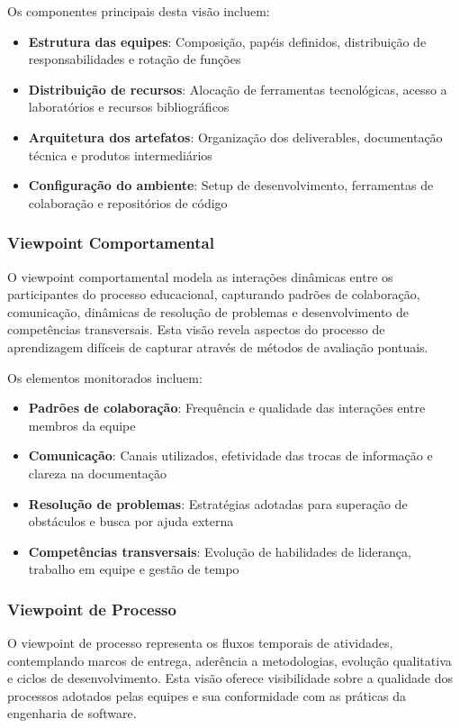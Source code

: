 \documentclass[english, spanish, brazilian]{modelo_dt}
\begin{document}
Os componentes principais desta visão incluem:
\begin{itemize}
\item \textbf{Estrutura das equipes}: Composição, papéis definidos, distribuição de responsabilidades e rotação de funções
\item \textbf{Distribuição de recursos}: Alocação de ferramentas tecnológicas, acesso a laboratórios e recursos bibliográficos
\item \textbf{Arquitetura dos artefatos}: Organização dos deliverables, documentação técnica e produtos intermediários
\item \textbf{Configuração do ambiente}: Setup de desenvolvimento, ferramentas de colaboração e repositórios de código
\end{itemize}

\subsubsection{Viewpoint Comportamental}

O viewpoint comportamental modela as interações dinâmicas entre os participantes do processo educacional, capturando padrões de colaboração, comunicação, dinâmicas de resolução de problemas e desenvolvimento de competências transversais\@. Esta visão revela aspectos do processo de aprendizagem difíceis de capturar através de métodos de avaliação pontuais\@.

Os elementos monitorados incluem:
\begin{itemize}
\item \textbf{Padrões de colaboração}: Frequência e qualidade das interações entre membros da equipe
\item \textbf{Comunicação}: Canais utilizados, efetividade das trocas de informação e clareza na documentação
\item \textbf{Resolução de problemas}: Estratégias adotadas para superação de obstáculos e busca por ajuda externa
\item \textbf{Competências transversais}: Evolução de habilidades de liderança, trabalho em equipe e gestão de tempo
\end{itemize}

\subsubsection{Viewpoint de Processo}

O viewpoint de processo representa os fluxos temporais de atividades, contemplando marcos de entrega, aderência a metodologias, evolução qualitativa e ciclos de desenvolvimento\@. Esta visão oferece visibilidade sobre a qualidade dos processos adotados pelas equipes e sua conformidade com as práticas da engenharia de software\@.
\end{document}
